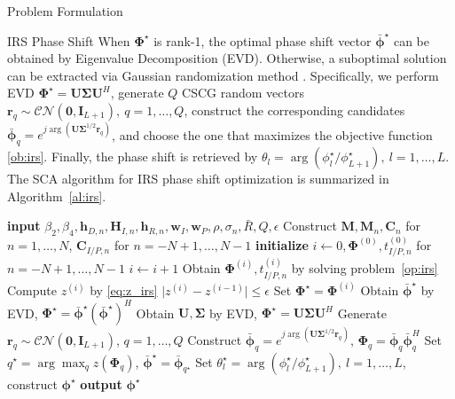 \documentclass[journal]{IEEEtran}
\begin{document}
\begin{section}{Problem Formulation}
\begin{subsection}{IRS Phase Shift}
			When $\boldsymbol{\Phi}^{\star}$ is rank-\num{1}, the optimal phase shift vector $\bar{\boldsymbol{\phi}}^\star$ can be obtained by Eigenvalue Decomposition (EVD). Otherwise, a suboptimal solution can be extracted via Gaussian randomization method \cite{Huang2010}. Specifically, we perform EVD $\boldsymbol{\Phi}^{\star}=\boldsymbol{U}\boldsymbol{\Sigma}\boldsymbol{U}^H$, generate $Q$ CSCG random vectors $\boldsymbol{r}_q \sim \mathcal{CN}(\boldsymbol{0},\boldsymbol{I}_{L+1}),\ q=1,\dots,Q$, construct the corresponding candidates $\bar{\boldsymbol{\phi}}_q=e^{j\arg\left(\boldsymbol{U}\boldsymbol{\Sigma}^{1/2}\boldsymbol{r}_q\right)}$, and choose the one that maximizes the objective function \ref{ob:irs}. Finally, the phase shift is retrieved by $\theta_l=\arg(\phi_l^\star/\phi_{L+1}^\star), \ l=1,\dots,L$. The SCA algorithm for IRS phase shift optimization is summarized in Algorithm~\ref{al:irs}.
			\begin{algorithm}[!t]
				\caption{SCA: IRS Phase Shift.}
				\label{al:irs}
				\begin{algorithmic}[1]
					\State \textbf{input} $\beta_2,\beta_4,\boldsymbol{h}_{D,n},\boldsymbol{H}_{I,n},\boldsymbol{h}_{R,n},\boldsymbol{w}_I,\boldsymbol{w}_P,\rho,\sigma_n,\bar{R},Q,\epsilon$
					\State Construct $\boldsymbol{M},\boldsymbol{M}_n,\boldsymbol{C}_{n}$ for $n=1,\dots,N$, $\boldsymbol{C}_{I/P,n}$ for $n=-N+1,\dots,N-1$
					\State \textbf{initialize} $i \gets 0,\boldsymbol{\Phi}^{(0)},t_{I/P,n}^{(0)}$ for $n=-N+1,\dots,N-1$
					\Repeat
						\State $i \gets i + 1$
						\State Obtain $\boldsymbol{\Phi}^{(i)}, t_{I/P,n}^{(i)}$ by solving problem~\ref{op:irs}
						\State Compute $z^{(i)}$ by \ref{eq:z_irs}
					\Until $\lvert z^{(i)}-z^{(i-1)} \rvert \le \epsilon$
					\State Set $\boldsymbol{\Phi}^{\star}=\boldsymbol{\Phi}^{(i)}$
						\State Obtain $\bar{\boldsymbol{\phi}}^\star$ by EVD, $\boldsymbol{\Phi}^{\star}=\bar{\boldsymbol{\phi}}^\star(\bar{\boldsymbol{\phi}}^\star)^H$
					\Else
						\State Obtain $\boldsymbol{U},\boldsymbol{\Sigma}$ by EVD, $\boldsymbol{\Phi}^{\star}=\boldsymbol{U}\boldsymbol{\Sigma}\boldsymbol{U}^H$
						\State Generate $\boldsymbol{r}_q \sim \mathcal{CN}(\boldsymbol{0},\boldsymbol{I}_{L+1})$, $q=1,\dots,Q$
						\State Construct $\bar{\boldsymbol{\phi}}_q=e^{j\arg\left(\boldsymbol{U}\boldsymbol{\Sigma}^{1/2}\boldsymbol{r}_q\right)}$, $\boldsymbol{\Phi}_q=\bar{\boldsymbol{\phi}}_q\bar{\boldsymbol{\phi}}_q^H$
						\State Set $q^{\star}=\arg\max_q{z(\boldsymbol{\Phi}_q)}$, $\bar{\boldsymbol{\phi}}^\star=\bar{\boldsymbol{\phi}}_{q^{\star}}$
					\EndIf
					\State Set $\theta_l^\star=\arg(\phi_l^\star/\phi_{L+1}^\star), \ l=1,\dots,L$, construct $\boldsymbol{\phi}^{\star}$
					\State \textbf{output} $\boldsymbol{\phi}^{\star}$
				\end{algorithmic}
			\end{algorithm}
		\end{subsection}



\end{section}
\end{document}
